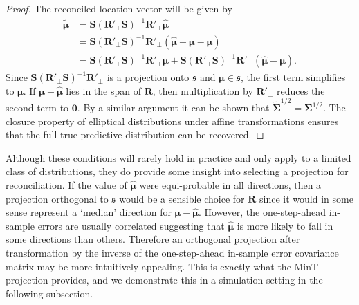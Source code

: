 \documentclass[12pt]{article}
\theoremstyle{definition}
\begin{document}
\begin{proof}
	The reconciled location vector will be given by
	\begin{align*}
		\tilde{\bm{\mu}}&=\bm{S}(\bm{R}'_{\perp}\bm{S})^{-1}\bm{R}'_{\perp}\hat{\bm{\mu}}\\
		&=\bm{S}(\bm{R}'_{\perp}\bm{S})^{-1}\bm{R}'_{\perp}\left(\hat{\bm{\mu}}+\bm{\mu}-\bm{\mu}\right)\\
		&=\bm{S}(\bm{R}'_{\perp}\bm{S})^{-1}\bm{R}'_{\perp}\bm{\mu}+\bm{S}(\bm{R}'_{\perp}\bm{S})^{-1}\bm{R}'_{\perp}\left(\hat{\bm{\mu}}-\bm{\mu}\right).
	\end{align*}
	Since $\bm{S}(\bm{R}'_{\perp}\bm{S})^{-1}\bm{R}'_{\perp}$ is a projection onto $\mathfrak{s}$ and $\bm{\mu}\in\mathfrak{s}$, the first term simplifies to $\bm{\mu}$. If $\bm{\mu}-\hat{\bm{\mu}}$ lies in the span of $\bm{R}$, then multiplication by $\bm{R}'_{\perp}$ reduces the second term to $\bm{0}$. By a similar argument it can be shown that $\tilde{\bm{\Sigma}}^{1/2}=\bm{\Sigma}^{1/2}$. The closure property of elliptical distributions under affine transformations ensures that the full true predictive distribution can be recovered.
\end{proof}

Although these conditions will rarely hold in practice and only apply to a limited class of distributions, they do provide some insight into selecting a projection for reconciliation. If the value of $\hat{\bm{\mu}}$ were equi-probable in all directions, then a projection orthogonal to $\mathfrak{s}$ would be a sensible choice for $\bm{R}$ since it would in some sense represent a `median' direction for $\bm{\mu}-\hat{\bm{\mu}}$. However, the one-step-ahead in-sample errors are usually correlated suggesting that $\hat{\bm{\mu}}$ is more likely to fall in some directions than others. Therefore an orthogonal projection after transformation by the inverse of the one-step-ahead in-sample error covariance matrix may be more intuitively appealing. This is exactly what the MinT projection provides, and we demonstrate this in a simulation setting in the following subsection.



\end{document}
